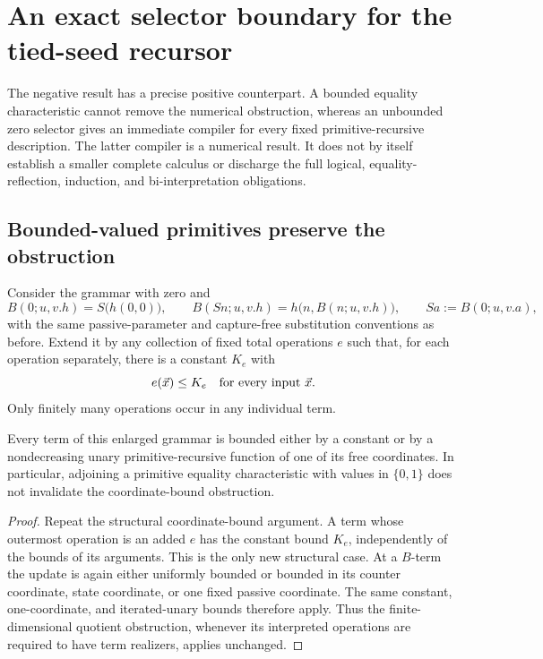 \section{An exact selector boundary for the tied-seed recursor}
\label{sec:selector-repair}

The negative result has a precise positive counterpart. A bounded equality
characteristic cannot remove the numerical obstruction, whereas an unbounded
zero selector gives an immediate compiler for every fixed primitive-recursive
description. The latter compiler is a numerical result. It does not by itself
establish a smaller complete calculus or discharge the full logical,
equality-reflection, induction, and bi-interpretation obligations.

\subsection{Bounded-valued primitives preserve the obstruction}

Consider the grammar with zero and
\[
 B(0;u,v.h)=S\bigl(h(0,0)\bigr),\qquad
 B(Sn;u,v.h)=h\bigl(n,B(n;u,v.h)\bigr),
 \qquad Sa:=B(0;u,v.a),
\]
with the same passive-parameter and capture-free substitution conventions as
before. Extend it by any collection of fixed total operations $e$ such that,
for each operation separately, there is a constant $K_e$ with
\[
                         e(\vec x)\le K_e
                         \quad\hbox{for every input }\vec x.
\]
Only finitely many operations occur in any individual term.

\begin{proposition}
Every term of this enlarged grammar is bounded either by a constant or by
a nondecreasing unary primitive-recursive function of one of its free
coordinates. In particular, adjoining a primitive equality characteristic
with values in $\{0,1\}$ does not invalidate the coordinate-bound obstruction.
\end{proposition}
\begin{proof}
Repeat the structural coordinate-bound argument. A term whose outermost
operation is an added $e$ has the constant bound $K_e$, independently of
the bounds of its arguments. This is the only new structural case. At a
$B$-term the update is again either uniformly bounded or bounded in its
counter coordinate, state coordinate, or one fixed passive coordinate.
The same constant, one-coordinate, and iterated-unary bounds therefore apply.
Thus the finite-dimensional quotient obstruction, whenever its interpreted
operations are required to have term realizers, applies unchanged.
\end{proof}

